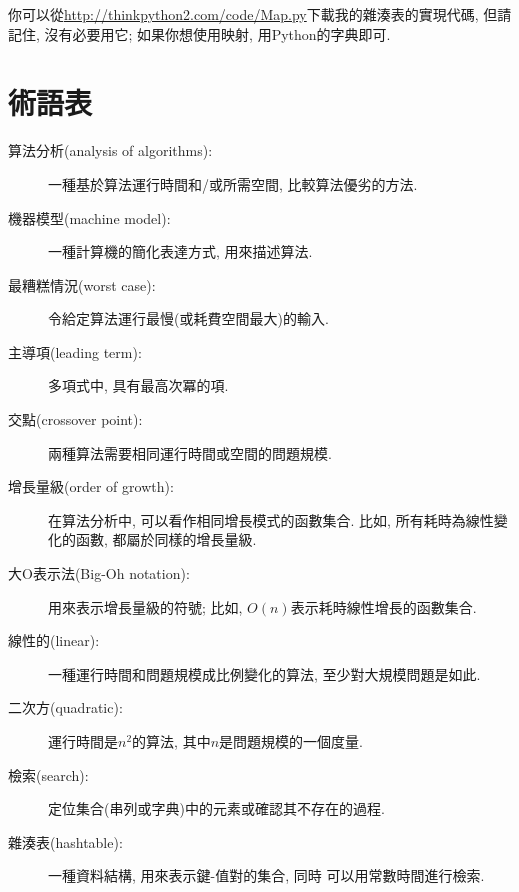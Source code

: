 \documentclass[10pt]{book}
\begin{document}
你可以從\url{http://thinkpython2.com/code/Map.py}下載我的雜湊表的實現代碼,
但請記住, 沒有必要用它; 如果你想使用映射, 用Python的字典即可.

\section{術語表}

\begin{description}

\item[算法分析(analysis of algorithms):] 一種基於算法運行時間和/或所需空間, 比較算法優劣的方法. 

\item[機器模型(machine model):] 一種計算機的簡化表達方式, 用來描述算法.

\item[最糟糕情況(worst case):] 令給定算法運行最慢(或耗費空間最大)的輸入.

\item[主導項(leading term):] 多項式中, 具有最高次冪的項.

\item[交點(crossover point):] 兩種算法需要相同運行時間或空間的問題規模.

\item[增長量級(order of growth):] 在算法分析中, 可以看作相同增長模式的函數集合.
比如, 所有耗時為線性變化的函數, 都屬於同樣的增長量級.

\item[大O表示法(Big-Oh notation):] 用來表示增長量級的符號;
比如, $O(n)$表示耗時線性增長的函數集合. 

\item[線性的(linear):] 一種運行時間和問題規模成比例變化的算法,
至少對大規模問題是如此.

\item[二次方(quadratic):] 運行時間是$n^2$的算法, 其中$n$是問題規模的一個度量. 

\item[檢索(search):] 定位集合(串列或字典)中的元素或確認其不存在的過程.

\item[雜湊表(hashtable):] 一種資料結構, 用來表示鍵-值對的集合, 同時
可以用常數時間進行檢索.

\end{description}


\printindex

\clearemptydoublepage
\end{document}
